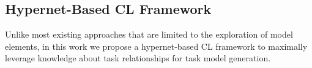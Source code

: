 \subsection{Hypernet-Based CL Framework}

Unlike most existing approaches that are limited to the exploration of model elements, in this work we propose a hypernet-based CL framework to maximally leverage knowledge about task relationships for task model generation.

